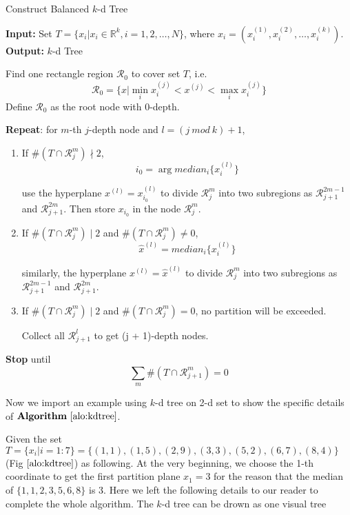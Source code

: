 	 \begin{algorithm}
    	\caption{Construct Balanced $k$-d Tree}
    	\label{alo:kdtree}
    	\textbf{Input:} Set $T=\{x_i | x_i\in\mathbb{R}^k, i=1,2,\dots,N\}$, where $x_{i} = (x_{i}^{(1)}, x_{i}^{(2)}, \dots, x_{i}^{(k)})$. \\
    	\textbf{Output:} $k$-d Tree

    	\begin{algorithmic}[1]
	\State Find one rectangle region $\mathscr{R}_{0}$ to cover set $T$, i.e.
	\[\mathscr{R}_{0} = \{x| \min_{i} x_{i}^{(j)} < x^{(j)} < \max_{i} x_{i}^{(j)}\}\]
         Define $\mathscr{R}_{0}$ as the root node with $0$-depth. 

    	 \State \textbf{Repeat}: for $m$-th $j$-depth node and $l = (j \ mod \ k) + 1$, 
	 
	 \begin{enumerate}[a]
	 \item If $\# (T \cap  \mathscr{R}_{j}^{m}) \nmid 2$,  
	 $$ i_{0} = \arg median_{i}\{ x_{i}^{(l)}\}$$
	 
	 use the hyperplane $x^{(l)} = x_{i_{0}}^{(l)}$ to divide $\mathscr{R}_{j}^{m}$ into two subregions as $\mathscr{R}_{j + 1}^{2m-1}$ and $\mathscr{R}_{j + 1}^{2m}$. Then store $x_{i_{0}}$ in the node $\mathscr{R}_{j}^{m}$.
	 
	 \item If $\# (T \cap  \mathscr{R}_{j}^{m}) \mid 2$ and $\# (T \cap  \mathscr{R}_{j}^{m}) \neq 0$, 
	 $$ \hat{x}^{(l)} = median_{i}\{ x_{i}^{(l)}\}$$
	 
	 similarly, the hyperplane $x^{(l)} = \hat{x}^{(l)}$ to divide $\mathscr{R}_{j}^{m}$ into two subregions as $\mathscr{R}_{j + 1}^{2m-1}$ and $\mathscr{R}_{j + 1}^{2m}$.
	 
	 \item If $\# (T \cap  \mathscr{R}_{j}^{m}) \mid 2$ and $\# (T \cap  \mathscr{R}_{j}^{m}) = 0$, no partition will be exceeded.
	 
	 Collect all $\mathscr{R}_{j + 1}^{l}$ to get (j + 1)-depth nodes.
  	 \end{enumerate}
	 \textbf{Stop} until 
	 \[ \sum_{m} \# (T \cap  \mathscr{R}_{j + 1}^{m}) = 0 \]
    	\end{algorithmic}
    \end{algorithm}
    
    Now we import an example using $k$-d tree on 2-d set to show the specific details of $\textbf{Algorithm} \  \ref{alo:kdtree}$. 
    
    Given the set $T = \{x_{i}| i = 1: 7\} = \{(1, 1), (1, 5), (2, 9), (3, 3), (5, 2), (6, 7), (8, 4)\}$(Fig $\ref{alo:kdtree}$) as following. At the very beginning, we choose the 1-th coordinate to get the first partition plane $x_{1} = 3$ for the reason that the median of $\{1, 1, 2, 3, 5, 6, 8\}$ is 3. Here we left the following details to our reader to complete the whole algorithm. The $k$-d tree can be drown as one visual tree%
    
